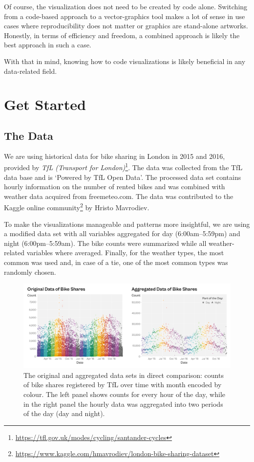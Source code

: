 \documentclass[
]{krantz}
\renewcommand{\href}[2]{#2\footnote{\url{#1}}}
\begin{document}
Of course, the visualization does not need to be created by code alone.
Switching from a code-based approach to a vector-graphics tool makes a
lot of sense in use cases where reproducibility does not matter or
graphics are stand-alone artworks. Honestly, in terms of efficiency and
freedom, a combined approach is likely the best approach in such a case.

With that in mind, knowing how to code visualizations is likely
beneficial in any data-related field.

\hypertarget{get-started}{%
\chapter{Get Started}\label{get-started}}

\hypertarget{data}{%
\section{The Data}\label{data}}

We are using historical data for bike sharing in London in 2015 and 2016, provided by \href{https://tfl.gov.uk/modes/cycling/santander-cycles}{\emph{TfL (Transport for London)}}. The data was collected from the TfL data base and is `Powered by TfL Open Data'. The processed data set contains hourly information on the number of rented bikes and was combined with weather data acquired from freemeteo.com. The data was contributed to the \href{https://www.kaggle.com/hmavrodiev/london-bike-sharing-dataset}{Kaggle online community} by Hristo Mavrodiev.

To make the visualizations manageable and patterns more insightful, we are using a modified data set with all variables aggregated for day (6:00am--5:59pm) and night (6:00pm--5:59am). The bike counts were summarized while all weather-related variables where averaged. Finally, for the weather types, the most common was used and, in case of a tie, one of the most common types was randomly chosen.

\begin{figure}
\centering
\includegraphics{./img/setup-data-comparison-raw-aggregated.png}
\caption{\label{fig:img-data-comparison}The original and aggregated data sets in direct comparison: counts of bike shares registered by TfL over time with month encoded by colour. The left panel shows counts for every hour of the day, while in the right panel the hourly data was aggregated into two periods of the day (day and night).}
\end{figure}
\end{document}
